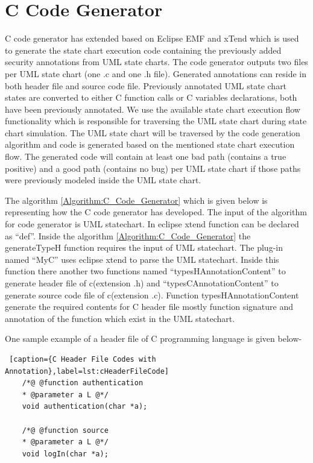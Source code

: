 \section{C Code Generator}
C code generator \cite{ref_108_paul2015infoflow} has extended based on Eclipse EMF and xTend which is used to generate the state chart execution code containing the previously added security annotations from UML state charts. The code generator outputs two files per UML state chart (one .c and one
.h file). Generated annotations can reside in both header file
and source code file. Previously annotated UML state chart
states are converted to either C function calls or C variables
declarations, both have been previously annotated. We use
the available state chart execution flow functionality which is
responsible for traversing the UML state chart during state
chart simulation. The UML state chart will be traversed by the code generation algorithm and code is generated based on
the mentioned state chart execution flow. The generated code
will contain at least one bad path (contains a true positive) and
a good path (contains no bug) per UML state chart if those
paths were previously modeled inside the UML state chart.

The algorithm \ref{Algorithm:C_Code_Generator} which is given below is representing how the C code generator has developed. The input of the algorithm for code generator is UML statechart. In eclipse xtend \cite{ref_20_xtend} function can be declared as \enquote{def}. Inside the algorithm \ref{Algorithm:C_Code_Generator} the generateTypeH function requires the input of UML statechart. The plug-in named \enquote{MyC} uses eclipse xtend to parse the UML statechart. Inside this function there another two functions named \enquote{typesHAnnotationContent} to generate header file of c(extension .h) and \enquote{typesCAnnotationContent} to generate source code file of c(extension .c). Function typesHAnnotationContent generate the required contents for C header file mostly function signature and annotation of the function which exist in the UML statechart. 

One sample example of a header file of C programming language is given below-

\begin{lstlisting} [caption={C Header File Codes with Annotation},label=lst:cHeaderFileCode]
	/*@ @function authentication
	* @parameter a L @*/
	void authentication(char *a);
	
	/*@ @function source
	* @parameter a L @*/
	void logIn(char *a);
\end{lstlisting}

